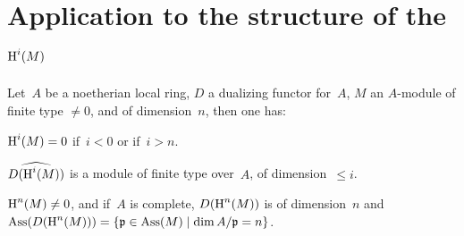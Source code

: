 \section{Application to the structure of the $\operatorname{H}^i(M)$} \label{V.3}

\setcounter{equation}{14}

\begin{theorem} \label{V.3.1} Let~$A$ be a noetherian local ring, $D$ a dualizing functor for~$A$, $M$ an $A$-module of finite type $\neq 0$, and of dimension~$n$, then one has:
\begin{enumeratei}
\item
$\operatorname{H}^{i}(M)=0$ if~$i<0$ or if~$i>n$.
\item
$\widehat{D(\operatorname{H}^{i}(M))}$ is a module of finite type over~$\widehat{A}$, of dimension~$\leq i$.
\item
$\operatorname{H}^{n}(M)\neq 0$, and if~$A$ is complete, $D(\operatorname{H}^{n}(M))$ is of dimension~$n$ and $\operatorname{Ass}(D(\operatorname{H}^{n}(M)))=\{ \mathfrak{p}\in\operatorname{Ass}(M) \mid \dim A/\mathfrak{p}=n\}$.
\end{enumeratei}
\end{theorem}


